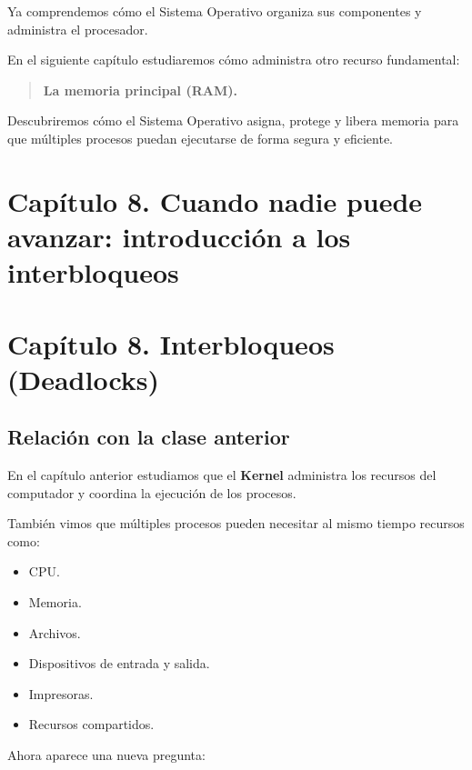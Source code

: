\documentclass[
  spanish,
  letterpaper,
]{scrbook}
\providecommand{\tightlist}{%
  \setlength{\itemsep}{0pt}\setlength{\parskip}{0pt}}
\begin{document}
Ya comprendemos cómo el Sistema Operativo organiza sus componentes y
administra el procesador.

En el siguiente capítulo estudiaremos cómo administra otro recurso
fundamental:

\begin{quote}
\textbf{La memoria principal (RAM).}
\end{quote}

Descubriremos cómo el Sistema Operativo asigna, protege y libera memoria
para que múltiples procesos puedan ejecutarse de forma segura y
eficiente.


\chapter{Capítulo 8. Cuando nadie puede avanzar: introducción a los
interbloqueos}\label{capuxedtulo-8.-cuando-nadie-puede-avanzar-introducciuxf3n-a-los-interbloqueos}


\chapter{Capítulo 8. Interbloqueos
(Deadlocks)}\label{capuxedtulo-8.-interbloqueos-deadlocks}

\section{Relación con la clase
anterior}\label{relaciuxf3n-con-la-clase-anterior-2}

En el capítulo anterior estudiamos que el \textbf{Kernel} administra los
recursos del computador y coordina la ejecución de los procesos.

También vimos que múltiples procesos pueden necesitar al mismo tiempo
recursos como:

\begin{itemize}
\tightlist
\item
  CPU.
\item
  Memoria.
\item
  Archivos.
\item
  Dispositivos de entrada y salida.
\item
  Impresoras.
\item
  Recursos compartidos.
\end{itemize}

Ahora aparece una nueva pregunta:
\end{document}
